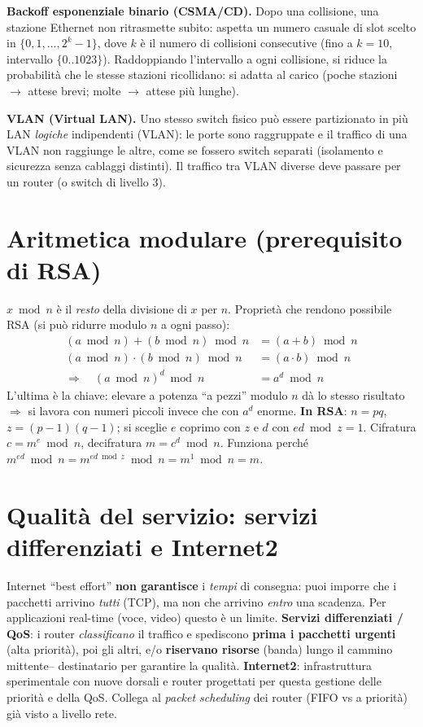 \documentclass[11pt,a4paper]{report}
\begin{document}
\textbf{Backoff esponenziale binario (CSMA/CD).} Dopo una collisione, una stazione
Ethernet non ritrasmette subito: aspetta un numero casuale di slot scelto in
$\{0,1,\dots,2^k-1\}$, dove $k$ è il numero di collisioni consecutive (fino a
$k=10$, intervallo $\{0..1023\}$). Raddoppiando l'intervallo a ogni collisione, si
riduce la probabilità che le stesse stazioni ricollidano: si adatta al carico
(poche stazioni $\to$ attese brevi; molte $\to$ attese più lunghe).

\textbf{VLAN (Virtual LAN).} Uno stesso switch fisico può essere partizionato in
più LAN \emph{logiche} indipendenti (VLAN): le porte sono raggruppate e il
traffico di una VLAN non raggiunge le altre, come se fossero switch separati
(isolamento e sicurezza senza cablaggi distinti). Il traffico tra VLAN diverse
deve passare per un router (o switch di livello 3).

\section{Aritmetica modulare (prerequisito di RSA)}
\label{th:modulare}
$x \bmod n$ è il \emph{resto} della divisione di $x$ per $n$. Proprietà che
rendono possibile RSA (si può ridurre modulo $n$ a ogni passo):
\[
\begin{aligned}
(a \bmod n) + (b \bmod n) \bmod n &= (a+b)\bmod n\\
(a \bmod n) \cdot (b \bmod n) \bmod n &= (a\cdot b)\bmod n\\
\Rightarrow\quad (a \bmod n)^d \bmod n &= a^d \bmod n
\end{aligned}
\]
L'ultima è la chiave: elevare a potenza ``a pezzi'' modulo $n$ dà lo stesso
risultato $\Rightarrow$ si lavora con numeri piccoli invece che con $a^d$ enorme.
\textbf{In RSA}: $n=pq$, $z=(p-1)(q-1)$; si sceglie $e$ coprimo con $z$ e $d$ con
$ed\bmod z=1$. Cifratura $c=m^e\bmod n$, decifratura $m=c^d\bmod n$. Funziona
perché $m^{ed}\bmod n = m^{ed\bmod z}\bmod n = m^1\bmod n = m$.

\section{Qualità del servizio: servizi differenziati e Internet2}
\label{th:qos}
Internet ``best effort'' \textbf{non garantisce} i \emph{tempi} di consegna:
puoi imporre che i pacchetti arrivino \emph{tutti} (TCP), ma non che arrivino
\emph{entro} una scadenza. Per applicazioni real-time (voce, video) questo è un
limite. \textbf{Servizi differenziati / QoS}: i router \emph{classificano} il
traffico e spediscono \textbf{prima i pacchetti urgenti} (alta priorità), poi gli
altri, e/o \textbf{riservano risorse} (banda) lungo il cammino mittente--
destinatario per garantire la qualità. \textbf{Internet2}: infrastruttura
sperimentale con nuove dorsali e router progettati per questa gestione delle
priorità e della QoS. Collega al \emph{packet scheduling} dei router (FIFO vs a
priorità) già visto a livello rete.
\end{document}
